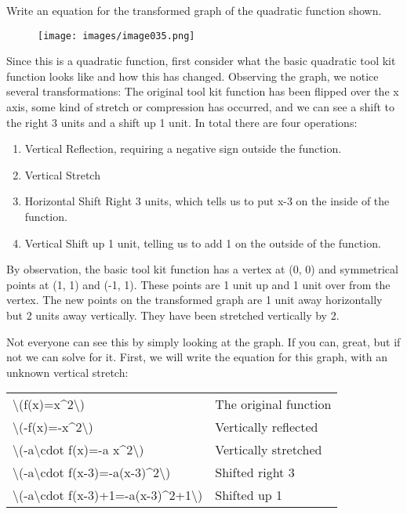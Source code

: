 Write an equation for the transformed graph of the quadratic function
shown.

\begin{figure}
\centering
\texttt{[image: images/image035.png]}
\caption{}
\end{figure}

Since this is a quadratic function, first consider what the basic
quadratic tool kit function looks like and how this has changed.
Observing the graph, we notice several transformations: The original
tool kit function has been flipped over the x axis, some kind of stretch
or compression has occurred, and we can see a shift to the right 3 units
and a shift up 1 unit. In total there are four operations:

\begin{enumerate}
\tightlist
\item
  Vertical Reflection, requiring a negative sign outside the function.
\item
  Vertical Stretch
\item
  Horizontal Shift Right 3 units, which tells us to put x-3 on the
  inside of the function.
\item
  Vertical Shift up 1 unit, telling us to add 1 on the outside of the
  function.
\end{enumerate}

By observation, the basic tool kit function has a vertex at (0, 0) and
symmetrical points at (1, 1) and (-1, 1). These points are 1 unit up and
1 unit over from the vertex. The new points on the transformed graph are
1 unit away horizontally but 2 units away vertically. They have been
stretched vertically by 2.

Not everyone can see this by simply looking at the graph. If you can,
great, but if not we can solve for it. First, we will write the equation
for this graph, with an unknown vertical stretch:

\begin{longtable}[]{@{}ll@{}}
\toprule
\endhead
\textbackslash{}(f(x)=x\^{}2\textbackslash{}) & The original
function\tabularnewline
\textbackslash{}(-f(x)=-x\^{}2\textbackslash{}) & Vertically
reflected\tabularnewline
\textbackslash{}(-a\textbackslash{}cdot f(x)=-a x\^{}2\textbackslash{})
& Vertically stretched\tabularnewline
\textbackslash{}(-a\textbackslash{}cdot
f(x-3)=-a(x-3)\^{}2\textbackslash{}) & Shifted right 3\tabularnewline
\textbackslash{}(-a\textbackslash{}cdot
f(x-3)+1=-a(x-3)\^{}2+1\textbackslash{}) & Shifted up 1\tabularnewline
\bottomrule
\end{longtable}

